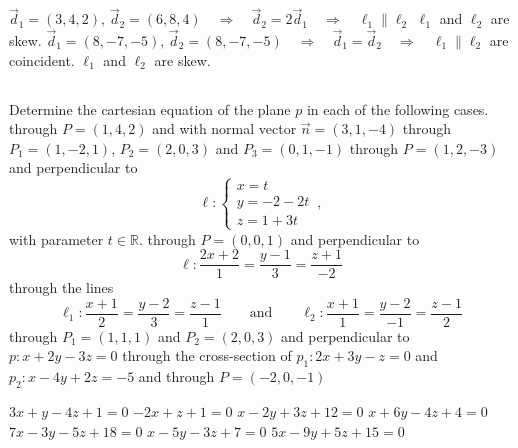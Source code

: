 \begin{Answer}\phantom{}
   
     \Question $\vec d_1 = (3,4,2), \, \vec d_2 = (6,8,4) \quad \Rightarrow \quad  \vec d_2 = 2 \vec d_1\quad \Rightarrow \quad \ell_1 \parallel \ell_2$
     \Question $\ell_1$ and $\ell_2$ are skew.
     \Question $\vec d_1 = (8,-7,-5), \, \vec d_2 = (8,-7,-5) \quad \Rightarrow \quad  \vec d_1 =  \vec d_2\quad \Rightarrow \quad \ell_1 \parallel \ell_2$ are coincident.
     \Question $\ell_1$ and $\ell_2$ are skew.
\end{Answer}


\subsection*{}
\begin{Exercise} Determine the cartesian equation of the plane $p$ in each of the following cases.
		\Question[difficulty = 1] through $P=(1,4,2)$ and with normal vector $\vec{n}=(3,1,-4)$
		\Question[difficulty = 1] through $P_1=(1,-2,1)$, $P_2=(2,0,3)$ and $P_3=(0,1,-1)$
		\Question[difficulty = 1] through $P=(1,2,-3)$ and perpendicular to $$\ell: \left\{\begin{array}{l}
		x=t\\y=-2-2t\\z=1+3t 
		\end{array}\right.\,,$$  with parameter $t \in \mathbb{R}$.
		\Question[difficulty = 1] through $P=(0,0,1)$ and perpendicular to
		$$ \ell: \dfrac{2x+2}{1}=\dfrac{y-1}{3}=\dfrac{z+1}{-2}$$
		\Question[difficulty = 2] through the lines $$\ell_1:
		\dfrac{x+1}{2}=\dfrac{y-2}{3}=\dfrac{z-1}{1}  \qquad \text{and} \qquad \ell_2:\dfrac{x+1}{1}=\dfrac{y-2}{-1}=\dfrac{z-1}{2}$$
		\Question[difficulty = 2] through $P_1=(1,1,1)$ and $ P_2=(2,0,3)$ and perpendicular to  $p: x+2y-3z=0$ 
		\Question[difficulty = 2] through the cross-section of  $p_1: 2x+3y-z=0$ and $p_2: x-4y+2z=-5$ and through $P=(-2,0,-1)$

\end{Exercise}

\begin{Answer}\phantom{}
    \begin{multicols}{2}
		\Question $3x+y-4z+1=0$
		\Question $-2x+z+1=0$
		\Question $x-2y+3z+12=0$
		\Question $x+6y-4z+4=0$
		\Question $7x-3y-5z+18=0$
		\Question $x-5y-3z+7=0$
		\Question $5x-9y+5z+15=0$
	\EndCurrentQuestion
	\end{multicols}
\end{Answer}
	


